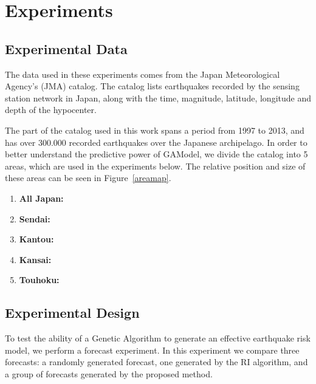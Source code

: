 \documentclass{sig-alternate}
\begin{document}

\section{Experiments}

\subsection{Experimental Data}\label{data}

The data used in these experiments comes from the Japan Meteorological
Agency's (JMA) catalog. The catalog lists earthquakes recorded by the
sensing station network in Japan, along with the time, magnitude,
latitude, longitude and depth of the hypocenter.

The part of the catalog used in this work spans a period from 1997 to
2013, and has over 300.000 recorded earthquakes over the Japanese
archipelago. In order to better understand the predictive power of
GAModel, we divide the catalog into 5 areas, which are used in the
experiments below. The relative position and size of these areas can
be seen in Figure~\ref{areamap}.

\begin{enumerate}
  \item {\bf All Japan:}
  \item {\bf Sendai:}
  \item {\bf Kantou:}
  \item {\bf Kansai:}
  \item {\bf Touhoku:}
\end{enumerate}


\subsection{Experimental Design} %

To test the ability of a Genetic Algorithm to generate an effective
earthquake risk model, we perform a forecast experiment. In this
experiment we compare three forecasts: a randomly generated forecast,
one generated by the RI algorithm, and a group of forecasts generated
by the proposed method.
\end{document}
